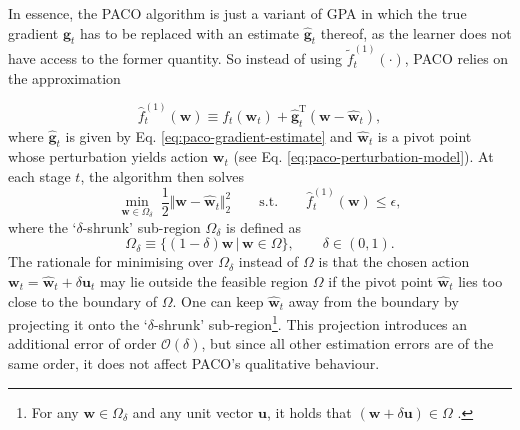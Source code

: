 \begin{mccorrection}
In essence, the PACO algorithm is just a variant of GPA in which the true gradient $\mathbf{g}_t$ has to be replaced with an estimate $\widehat{\mathbf{g}}_t$ thereof, as the learner does not have access to the former quantity. So instead of using $\widetilde{f}_t^{(1)}(\cdot)$, PACO relies on the approximation
\end{mccorrection}
\begin{equation}
	\widehat{f}_t^{(1)}(\mathbf{w})
	\equiv f_t(\mathbf{w}_t) + \widehat{\mathbf{g}}_t^{\text{T}}(\mathbf{w} - \widehat{\mathbf{w}}_t),
\end{equation}
where $\widehat{\mathbf{g}}_t$ is given by Eq. \eqref{eq:paco-gradient-estimate} and $\widehat{\mathbf{w}}_t$ is a pivot point whose perturbation yields action $\mathbf{w}_t$ (see Eq. \eqref{eq:paco-perturbation-model}). At each stage $t$, the algorithm then solves
\begin{equation}
\label{eq:paco-optimisation-problem}
	\min_{\mathbf{w} \in \Omega_{\delta}} \; \frac{1}{2}\Vert\mathbf{w} - \widehat{\mathbf{w}}_t\Vert_2^2
	\qquad \text{s.t.} \qquad \widehat{f}_t^{(1)}(\mathbf{w}) \leq \epsilon,
\end{equation}
where the `$\delta$-shrunk' sub-region $\Omega_\delta$ is defined as
\begin{equation}
	 \Omega_\delta
	 \equiv \big\{(1-\delta)\mathbf{w} \, \big| \, \mathbf{w} \in \Omega\big\},
	 \qquad \delta \in (0, 1).
\end{equation}
The rationale for minimising over $\Omega_\delta$ instead of $\Omega$ is that the chosen action $\mathbf{w}_t = \widehat{\mathbf{w}}_t + \delta\mathbf{u}_t$ may lie outside the feasible region $\Omega$ if the pivot point $\widehat{\mathbf{w}}_t$ lies too close to the boundary of $\Omega$. One can keep $\widehat{\mathbf{w}}_t$ away from the boundary by projecting it onto the `$\delta$-shrunk' sub-region\footnote{For any $\mathbf{w} \in \Omega_\delta$ and any unit vector $\mathbf{u}$, it holds that $(\mathbf{w} + \delta\mathbf{u}) \in \Omega$ \citep[Observation~2]{flaxman05}.}. 
This projection introduces an additional error of order $\mathcal{O}(\delta)$, but since all other estimation errors are of the same order, it does not affect PACO's qualitative behaviour.

